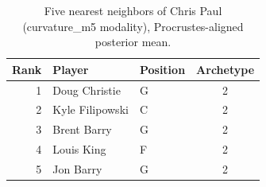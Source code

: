 \begin{table}[htbp]
  \centering\small
  \begin{tabular}{rllc}
    \toprule
    Rank & Player & Position & Archetype \\
    \midrule
    1 & Doug Christie & G & 2 \\
    2 & Kyle Filipowski & C & 2 \\
    3 & Brent Barry & G & 2 \\
    4 & Louis King & F & 2 \\
    5 & Jon Barry & G & 2 \\
    \bottomrule
  \end{tabular}
  \caption{Five nearest neighbors of Chris Paul (curvature_m5 modality), Procrustes-aligned posterior mean.}
  \label{tab:Chris_Paul_neighbors_curvature_m5}
\end{table}

